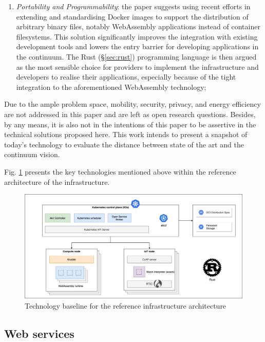 \begin{enumerate}
    \item \emph{Portability and Programmability}: the paper suggests using recent efforts in extending and standardising Docker images to support the distribution of arbitrary binary files, notably WebAssembly applications instead of container filesystems. This solution significantly improves the integration with existing development tools and lowers the entry barrier for developing applications in the continuum. The Rust (§\ref{sec:rust}) programming language is then argued as the most sensible choice for providers to implement the infrastructure and developers to realise their applications, especially because of the tight integration to the aforementioned WebAssembly technology;
\end{enumerate}

Due to the ample problem space, mobility, security, privacy, and energy efficiency are not addressed in this paper and are left as open research questions. Besides, by any means, it is also not in the intentions of this paper to be assertive in the technical solutions proposed here. This work intends to present a snapshot of today's technology to evaluate the distance between state of the art and the continuum vision.

Fig. \ref{fig:architecture-technologies} presents the key technologies mentioned above within the reference architecture of the infrastructure.

\begin{figure}[ht]
\centering
\includegraphics[width=\columnwidth]{figures/architecture-technologies}
\caption{Technology baseline for the reference infrastructure architecture \label{fig:architecture-technologies}}
\end{figure}

\subsection{Web services}
\label{sec:web}

